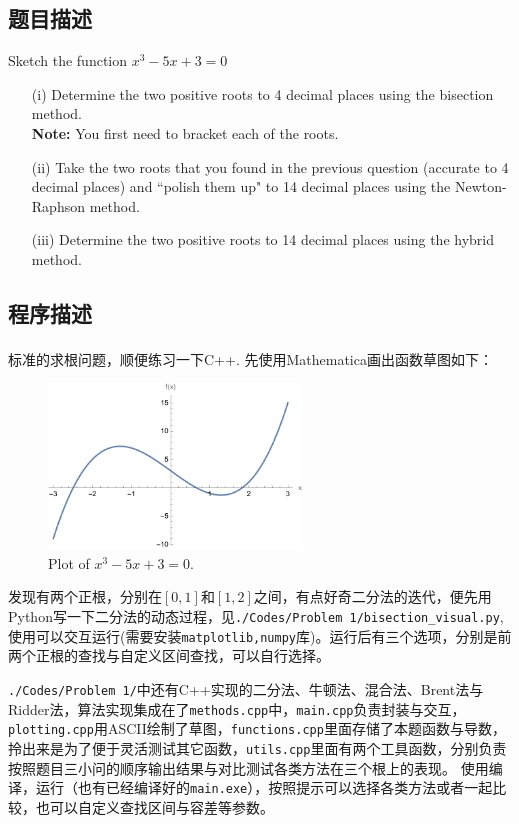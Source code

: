 \subsection{题目描述}
Sketch the function \boldmath\(x^3 - 5x + 3 = 0\)\unboldmath
\begin{enumerate}
    \item[(i)] Determine the two positive roots to 4 decimal places using the bisection method.\\
          \textbf{Note:} You first need to bracket each of the roots.

    \item[(ii)] Take the two roots that you found in the previous question (accurate to 4 decimal places) and ``polish them up" to 14 decimal places using the Newton-Raphson method.

    \item[(iii)] Determine the two positive roots to 14 decimal places using the hybrid method.
\end{enumerate}

\subsection{程序描述}
标准的求根问题，顺便练习一下C++. 先使用Mathematica\textsuperscript{\textregistered}画出函数草图如下：
\begin{figure}[H]
    \centering
    \includegraphics[width=0.6\textwidth]{Problem 1/Figs/1_plot.pdf}  %
    \caption{Plot of $x^3 - 5x + 3 = 0$.}
\end{figure}
\noindent 发现有两个正根，分别在$[0, 1]$和$[1, 2]$之间，有点好奇二分法的迭代，便先用Python写一下二分法的动态过程，见\texttt{./Codes/Problem 1/bisection\_visual.py},
使用可以交互运行(需要安装\texttt{matplotlib,numpy}库)。运行后有三个选项，分别是前两个正根的查找与自定义区间查找，可以自行选择。

\texttt{./Codes/Problem 1/}中还有C++实现的二分法、牛顿法、混合法、Brent法与Ridder法，算法实现集成在了\texttt{methods.cpp}中，\texttt{main.cpp}负责封装与交互，\texttt{plotting.cpp}用ASCII绘制了草图，\texttt{functions.cpp}里面存储了本题函数与导数，拎出来是为了便于灵活测试其它函数，\texttt{utils.cpp}里面有两个工具函数，分别负责按照题目三小问的顺序输出结果与对比测试各类方法在三个根上的表现。
使用编译，运行（也有已经编译好的\texttt{main.exe}），按照提示可以选择各类方法或者一起比较，也可以自定义查找区间与容差等参数。

